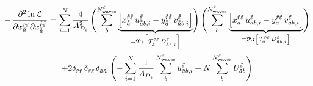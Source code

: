 \begin{multline}
  \label{eq:likelihood_function_re_re_deriv}
  -\dmd{\ln \mathcal{L}}{2}{{x_{\tilde{a}}^{\tilde{r} \tilde{\refl}}}}{}{{x_{\doubletilde{a}}^{\doubletilde{r} \doubletilde{\refl}}}}{}
  = \sum_{i = 1}^{N} \frac{4}{A_{D_i}^2}
  \rBrk[4]{\sum_b^{N^{\doubletilde{\refl}}_\text{waves}}
  \underbrace{\sBrk{x_{\doubletilde{a}}^{\doubletilde{r} \doubletilde{\refl}}\, u^{\doubletilde{\refl}}_{\doubletilde{a} b, i}
    - y_{\doubletilde{a}}^{\doubletilde{r} \doubletilde{\refl}}\, v^{\doubletilde{\refl}}_{\doubletilde{a} b, i}}}_{%
     = \Re\sBrk{\mathcal{T}_{\doubletilde{a}}^{\doubletilde{r} \doubletilde{\refl}}\, D^{\doubletilde{\refl}}_{\doubletilde{a} b, i}}}}
  \rBrk[4]{\sum_b^{N^{\tilde{\refl}}_\text{waves}}
  \underbrace{\sBrk{x_{\tilde{a}}^{\tilde{r} \tilde{\refl}}\, u^{\tilde{\refl}}_{\tilde{a} b, i}
    - y_{\tilde{a}}^{\tilde{r} \tilde{\refl}}\, v^{\tilde{\refl}}_{\tilde{a} b, i}}}_{%
    = \Re\sBrk{\mathcal{T}_{\tilde{a}}^{\tilde{r} \tilde{\refl}}\, D^{\tilde{\refl}}_{\tilde{a} b, i}}}} \\
  + 2 \delta_{\tilde{r} \doubletilde{r}}\, \delta_{\tilde{\refl} \doubletilde{\refl}}\, \delta_{\tilde{a} \doubletilde{a}}\,
  \rBrk[4]{-\sum_{i = 1}^{N} \frac{1}{A_{D_i}} \sum_b^{N^{\tilde{\refl}}_\text{waves}} u^{\tilde{\refl}}_{\tilde{a} b, i}
  + N \sum_b^{N^{\tilde{\refl}}_\text{waves}} U^{\tilde{\refl}}_{\tilde{a} b}}
\end{multline}


%
